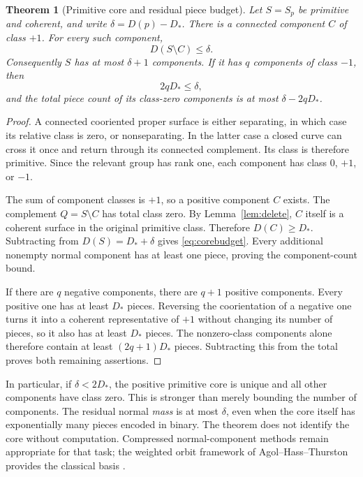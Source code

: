 \documentclass[11pt,letterpaper]{article}
\newtheorem{theorem}{Theorem}[section]
\theoremstyle{definition}
\begin{document}
\begin{theorem}[Primitive core and residual piece budget]\label{thm:core}
Let $S=S_p$ be primitive and coherent, and write $\delta=D(p)-D_*$. There is a connected component $C$ of class $+1$. For \emph{every} such component,
\begin{equation}\label{eq:corebudget}
 D(S\setminus C)\leq\delta.
\end{equation}
Consequently $S$ has at most $\delta+1$ components. If it has $q$ components of class $-1$, then
\begin{equation}\label{eq:opposite}
 2qD_*\leq\delta,
\end{equation}
and the total piece count of its class-zero components is at most $\delta-2qD_*$.
\end{theorem}
\begin{proof}
A connected cooriented proper surface is either separating, in which case its relative class is zero, or nonseparating. In the latter case a closed curve can cross it once and return through its connected complement. Its class is therefore primitive. Since the relevant group has rank one, each component has class $0$, $+1$, or $-1$.

The sum of component classes is $+1$, so a positive component $C$ exists. The complement $Q=S\setminus C$ has total class zero. By Lemma~\ref{lem:delete}, $C$ itself is a coherent surface in the original primitive class. Therefore $D(C)\geq D_*$. Subtracting from $D(S)=D_*+\delta$ gives \eqref{eq:corebudget}. Every additional nonempty normal component has at least one piece, proving the component-count bound.

If there are $q$ negative components, there are $q+1$ positive components. Every positive one has at least $D_*$ pieces. Reversing the coorientation of a negative one turns it into a coherent representative of $+1$ without changing its number of pieces, so it also has at least $D_*$ pieces. The nonzero-class components alone therefore contain at least $(2q+1)D_*$ pieces. Subtracting this from the total proves both remaining assertions.
\end{proof}

In particular, if $\delta<2D_*$, the positive primitive core is unique and all other components have class zero. This is stronger than merely bounding the number of components. The residual normal \emph{mass} is at most $\delta$, even when the core itself has exponentially many pieces encoded in binary. The theorem does not identify the core without computation. Compressed normal-component methods remain appropriate for that task; the weighted orbit framework of Agol--Hass--Thurston provides the classical basis \cite{aht}.
\end{document}
